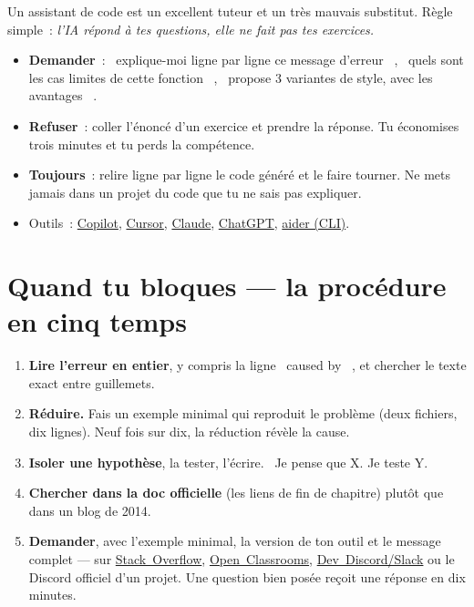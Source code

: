 \documentclass[12pt,a4paper,twoside,openright]{book}
\newcommand{\link}[2]{\href{#2}{#1}}
\begin{document}
Un assistant de code est un excellent tuteur et un tr\`es mauvais substitut. R\`egle simple~:
\emph{l'IA r\'epond \`a tes questions, elle ne fait pas tes exercices.}

\begin{itemize}
  \item \textbf{Demander}~: \og ~explique-moi ligne par ligne ce message d'erreur~ \fg{}, \og ~quels sont les
        cas limites de cette fonction~ \fg{}, \og ~propose 3 variantes de style, avec les avantages~ \fg{}.
  \item \textbf{Refuser}~: coller l'\'enonc\'e d'un exercice et prendre la r\'eponse. Tu \'economises
        trois minutes et tu perds la comp\'etence.
  \item \textbf{Toujours}~: relire ligne par ligne le code g\'en\'er\'e et le faire tourner. Ne
        mets jamais dans un projet du code que tu ne sais pas expliquer.
  \item Outils~: \link{Copilot}{https://github.com/features/copilot},
        \link{Cursor}{https://www.cursor.com/}, \link{Claude}{https://claude.ai/},
        \link{ChatGPT}{https://chat.openai.com/}, \link{aider (CLI)}{https://aider.chat/}.
\end{itemize}

\section{Quand tu bloques --- la proc\'edure en cinq temps}

\begin{enumerate}
  \item \textbf{Lire l'erreur en entier}, y compris la ligne \og ~caused by~ \fg{}, et chercher
        le texte exact entre guillemets.
  \item \textbf{R\'eduire.} Fais un exemple minimal qui reproduit le probl\`eme (deux fichiers,
        dix lignes). Neuf fois sur dix, la r\'eduction r\'ev\`ele la cause.
  \item \textbf{Isoler une hypoth\`ese}, la tester, l'\'ecrire. \og ~Je pense que X. Je teste Y.~ \fg{}
  \item \textbf{Chercher dans la doc officielle} (les liens de fin de chapitre) plut\^ot que
        dans un blog de 2014.
  \item \textbf{Demander}, avec l'exemple minimal, la version de ton outil et le message complet
        --- sur \link{Stack~Overflow}{https://stackoverflow.com/questions/tagged/javascript},
        \link{Open~Classrooms}{https://openclassrooms.com/forum},
        \link{Dev~Discord/Slack}{https://github.com/websites/DevChatter} ou le Discord officiel
        d'un projet. Une question bien pos\'ee re\c{c}oit une r\'eponse en dix minutes.
\end{enumerate}
\end{document}

